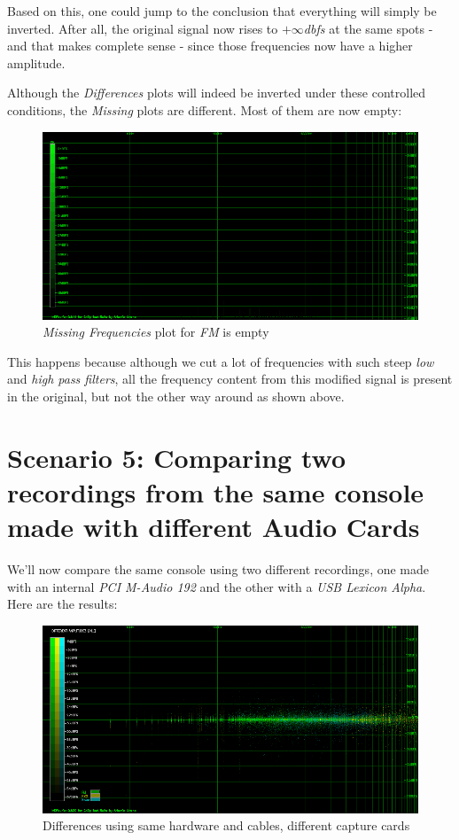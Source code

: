 \documentclass[10pt,a4paper]{report}
\newcommand{\db}[1]{\textit{#1\acrshort{dbfs}}}
\begin{document}
Based on this, one could jump to the conclusion that everything will simply be inverted. After all, the original signal now rises to \db{$+\infty$} at the same spots - and that makes complete sense -  since those frequencies now have a higher amplitude. 

Although the \textit{Differences} plots will indeed be inverted under these controlled conditions, the \textit{Missing} plots are different. Most of them are now empty:

\begin{figure}[H]
	\centering
	\includegraphics[width=1.0\linewidth]{images/interpretation/Plot4-8-Missing-FM-Inverted.png}
	\caption[Reversed FM Missing]{\textit{Missing Frequencies} plot for \textit{FM} is empty}
	\label{fig:plot4-8-missing-fm-inverted}
\end{figure}

This happens because although we cut a lot of frequencies with such steep \textit{low} and \textit{high pass filters}, all the frequency content from this modified signal is present in the original, but not the other way around as shown above.

\section{Scenario 5: Comparing two recordings from the same console made with different Audio Cards}

We'll now compare the same console using two different recordings, one made with an internal \textit{PCI M-Audio 192} and the other with a \textit{USB Lexicon Alpha}. Here are the results:

\begin{figure}[H]
	\centering
	\includegraphics[width=1.0\linewidth]{images/interpretation/Plot5-1-All.png}
	\caption[Reversed FM Missing]{Differences using same hardware and cables, different capture cards}
	\label{fig:plot5-1-all}
\end{figure}
\end{document}
